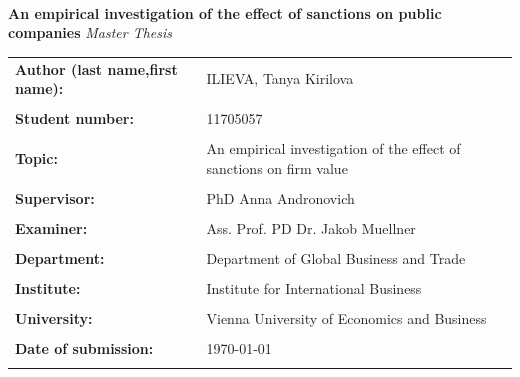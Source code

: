 \documentclass[12pt,a4paper]{article}
\begin{document}
\
%

\begin{titlepage}
        \Large
        \center
        \textbf{An empirical investigation of the effect \newline of sanctions on public companies}
            \small
            \vspace{0.5cm}
            \newline \textit{Master Thesis}
    \vspace{0.5cm}
    \fontsize{12}{11}\selectfont 
    
    \begin{longtable}{p{0.38\linewidth} p{0.65\linewidth}}
            \\   
            \textbf{Author (last name,\newline first name):} & ILIEVA, Tanya Kirilova\\ 
            \\
            \textbf{Student number:} & 11705057 \\
            \\
            \textbf{Topic:} & An empirical investigation of the effect of sanctions on firm value\\
            \\
            \textbf{Supervisor:} & PhD Anna Andronovich\\
            \\
            \textbf{Examiner:} & Ass. Prof. PD Dr. Jakob Muellner\\
            \\
            \textbf{Department:} & Department of Global Business and Trade\\
            \\
            \textbf{Institute:} & Institute for International Business\\
            \\
            \textbf{University:} & Vienna University of Economics and Business \\
           \\
           \textbf{Date of submission:} & \today \\
           \\
    \end{longtable}
           

\end{titlepage}
\end{document}
